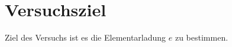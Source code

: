 \section{Versuchsziel}
\label{sec:Versuchsziel}

Ziel des Versuchs ist es die Elementarladung $e$ zu bestimmen.